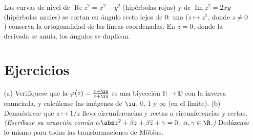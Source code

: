 \begin{omfigure}

{\small Las curvas de nivel de $\operatorname{Re}z^2 = x^2 - y^2$
(hipérbolas rojas) y de $\operatorname{Im}z^2 = 2xy$ (hipérbolas azules)
se cortan en ángulo recto lejos de $0$: una
($z \mapsto z^2$, donde $z \neq 0$) conserva la ortogonalidad de las
líneas coordenadas. En $z = 0$, donde la derivada se anula, los ángulos
se duplican.}
\end{omfigure}

\section{Ejercicios}

\begin{exercise}[$\star$]\label{exo:b3:conformal:1}
(a) Verifíquese que la  $\varphi(z) = \frac{z -
\iu}{z + \iu}$ es una biyección $\mathbb H \to \mathbb D$ con la inversa
enunciada, y calcúlense las imágenes de $\iu$, $0$, $1$ y $\infty$ (en
el límite). (b) Demuéstrese que $z \mapsto 1/z$ lleva circunferencias y
rectas a circunferencias y rectas. \emph{(Escríbase su ecuación común
$\alpha\abs z^2 + \bar\beta z + \beta\bar z + \gamma = 0$,
$\alpha, \gamma \in \R$.)} Dedúzcase lo mismo para todas las
transformaciones de Möbius.
\end{exercise}

